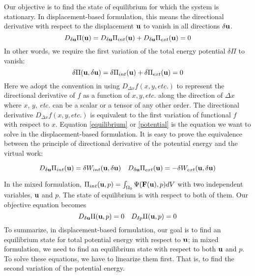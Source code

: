 Our objective is to find the state of equilibrium for which the system is stationary. In displacement-based formulation, this means the directional derivative with respect to the displacement $\bold{u}$ to vanish in all directions $\delta{\bold{u}}$.
\begin{equation} \label{equilibrium}
D_{\delta\bold{u}}\Pi(\bold{u}) = D_{\delta\bold{u}}\Pi_{int}(\bold{u}) + D_{\delta\bold{u}}\Pi_{ext}(\bold{u}) = 0
\end{equation} 
In other words, we require the first variation of the total energy potential $\delta\Pi$ to vanish:
\begin{equation} \label{potential}
\delta\Pi(\bold{u}, \delta\bold{u}) =\delta\Pi_{int}(\bold{u}) + \delta\Pi_{ext}(\bold{u}) = 0
\end{equation}
Here we adopt the convention in \cite{Holzapfel} using $D_{\Delta{x}}f(x, y, \textit{etc.})$ to represent the directional derivative of $f$ as a function of $x, y, \textit{etc.}$ along the direction of $\Delta{x}$ where $x$, $y$, \textit{etc.} can be a scalar or a tensor of any other order. The directional derivative $D_{\Delta{x}}f(x, y, \textit{etc.})$ is equivalent to the first variation of functional $f$ with respect to $x$.
Equation \ref{equilibrium} or \ref{potential} is the equation we want to solve in the displacement-based formulation. It is easy to prove the equivalence between the principle of directional derivative of the potential energy and the virtual work:

\begin{equation}
D_{\delta\bold{u}}\Pi_{int}(\bold{u}) = \delta W_{int}(\bold{u}, \delta\bold{u}) \quad
D_{\delta\bold{u}}\Pi_{ext}(\bold{u}) = - \delta W_{ext}(\bold{u}, \delta\bold{u})
\end{equation}

In the mixed formulation, $\Pi_{int}(\bold{u}, p) = \int_{\Omega_{0}}\Psi(\bold{F}(\bold{u}), p)dV$ with two independent variables, $\bold{u}$ and $p$. The state of equilibrium is with respect to both of them. Our objective equation becomes
\begin{equation} \label{target}
D_{\delta\bold{u}}\Pi(\bold{u}, p) = 0 \quad D_{\delta{p}}\Pi(\bold{u}, p) = 0
\end{equation}
To summarize, in displacement-based formulation, our goal is to find an equilibrium state for total potential energy with respect to $\bold{u}$; in mixed formulation, we need to find an equilibrium state with respect to both $\bold{u}$ and $p$. To solve these equations, we have to linearize them first. That is, to find the second variation of the potential energy.


